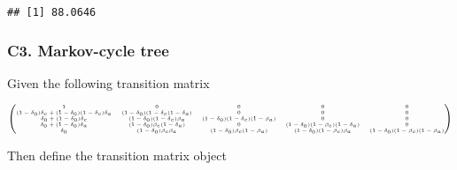 \documentclass[]{book}
\newenvironment{Shaded}{\begin{snugshade}}{\end{snugshade}}
\newcommand{\DataTypeTok}[1]{\textcolor[rgb]{0.13,0.29,0.53}{#1}}
\newcommand{\KeywordTok}[1]{\textcolor[rgb]{0.13,0.29,0.53}{\textbf{#1}}}
\newcommand{\NormalTok}[1]{#1}
\newcommand{\OperatorTok}[1]{\textcolor[rgb]{0.81,0.36,0.00}{\textbf{#1}}}
\newcommand{\OtherTok}[1]{\textcolor[rgb]{0.56,0.35,0.01}{#1}}
\newcommand{\StringTok}[1]{\textcolor[rgb]{0.31,0.60,0.02}{#1}}
\begin{document}
\begin{Shaded}
\end{Shaded}

\begin{verbatim}
## [1] 88.0646
\end{verbatim}

\hypertarget{c3.-markov-cycle-tree}{%
\subsubsection{C3. Markov-cycle tree}\label{c3.-markov-cycle-tree}}

Given the following transition matrix

\[
\tiny
\left(
\begin{matrix}
1 & 0 & 0 & 0 & 0\\
(1 - \delta_0)\delta_c + (1-\delta_0)(1-\delta_c)\delta_a & (1-\delta_0)(1-\delta_c(1-\delta_a) & 0 & 0 & 0\\
\delta_0 + (1-\delta_0)\delta_c & (1-\delta_0)(1-\delta_c)\beta_a & (1-\delta_0)(1-\delta_c)(1-\beta_a) & 0 & 0\\
\delta_0 + (1-\delta_0)\delta_a & (1-\delta_0)\beta_c(1-\delta_a) & 0 & (1-\delta_0)(1-\beta_c)(1-\delta_a) & 0\\
\delta_0 & (1-\delta_0)\beta_c\beta_a & (1-\delta_0)\beta_c(1-\beta_a) & (1-\delta_0)(1-\beta_c)\beta_a & (1-\delta_0)(1-\beta_c)(1-\beta_a)
\end{matrix}
\right)
\]

Then define the transition matrix object
\end{document}

